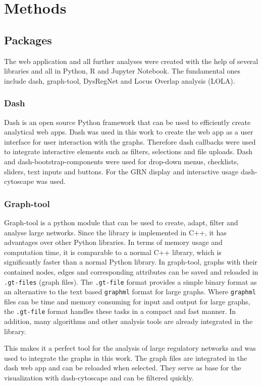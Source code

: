 \documentclass[pdftex,12pt,a4paper]{report}
\begin{document}
\chapter{Methods}
\section{Packages}
The web application and all further analyses were created with the help of several libraries and all in Python, R and Jupyter Notebook. The fundamental ones include dash\cite{dash}, graph-tool\cite{graph-tool}, DysRegNet\cite{dysregnet} and Locus Overlap analysis (LOLA)\cite{LOLA}.

\subsection{Dash}
\label{dash}
Dash is an open source Python framework that can be used to efficiently create analytical web apps. Dash was used in this work to create the web app as a user interface for user interaction with the graphs. Therefore dash callbacks were used to integrate interactive elements such as filters, selections and file uploads. Dash and dash-bootstrap-components were used for drop-down menus, checklists, sliders, text inputs and buttons. For the GRN display and interactive usage dash-cytoscape was used\cite{dash}.


\subsection{Graph-tool}
\label{graphtool}
Graph-tool is a python module that can be used to create, adapt, filter and analyse large networks. Since the library is implemented in C++, it has advantages over other Python libraries. In terms of memory usage and computation time, it is comparable to a normal C++ library, which is significantly faster than a normal Python library. In graph-tool, graphs with their contained nodes, edges and corresponding attributes can be saved and reloaded in \texttt{.gt-files} (graph files). The \texttt{.gt-file} format provides a simple binary format as an alternative to the text based \texttt{graphml} format for large graphs. Where \texttt{graphml} files can be time and memory consuming for input and output for large graphs, the \texttt{.gt-file} format handles these tasks in a compact and fast manner. In addition, many algorithms and other analysis tools are already integrated in the library\cite{graph-tool}.  

This makes it a perfect tool for the analysis of large regulatory networks and was used to integrate the graphs in this work. The graph files are integrated in the dash web app and can be reloaded when selected. They serve as base for the visualization with dash-cytoscape and can be filtered quickly.
\end{document}
